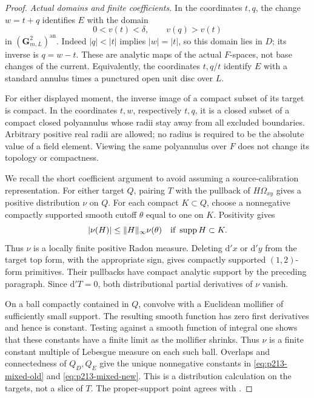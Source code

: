 \begin{proof}
\emph{Actual domains and finite coefficients.}
In the coordinates \(t,q\), the change \(w=t+q\) identifies
\(E\) with the domain
\[
             0<v(t)<\delta,\qquad v(q)>v(t)
\]
in \((\mathbf G_{m,L}^2)^{\mathrm{an}}\).
Indeed \(|q|<|t|\) implies \(|w|=|t|\), so this domain
lies in \(D\); its inverse is \(q=w-t\).
These are analytic maps of the actual \(F\)-spaces, not
base changes of the current. Equivalently, the coordinates
\(t,q/t\) identify \(E\) with a standard annulus times a
punctured open unit disc over \(L\).

For either displayed moment, the inverse image of a compact
subset of its target is compact. In the coordinates \(t,w\),
respectively \(t,q\), it is a closed subset of a compact
closed polyannulus whose radii stay away from all excluded
boundaries. Arbitrary positive real radii are allowed; no
radius is required to be the absolute value of a field
element. Viewing the same polyannulus over \(F\) does not
change its topology or compactness.

We recall the short coefficient argument to avoid assuming
a source-calibration representation. For either target \(Q\),
pairing \(T\) with the pullback of \(H\Omega_{xy}\) gives a
positive distribution \(\nu\) on \(Q\). For each compact
\(K\subset Q\), choose a nonnegative compactly supported
smooth cutoff \(\theta\) equal to one on \(K\). Positivity
gives
\[
 |\nu(H)|\leq\|H\|_\infty\nu(\theta)
       \quad\hbox{if }\operatorname{supp}H\subset K.
\]
Thus \(\nu\) is a locally finite positive Radon measure.
Deleting \(\mathrm d'x\) or \(\mathrm d'y\) from the target
top form, with the appropriate sign, gives compactly
supported \((1,2)\)-form primitives. Their pullbacks have
compact analytic support by the preceding paragraph.
Since \(\mathrm d'T=0\), both distributional partial
derivatives of \(\nu\) vanish.

On a ball compactly contained in \(Q\), convolve with a
Euclidean mollifier of sufficiently small support.
The resulting smooth function has zero first derivatives
and hence is constant. Testing against a smooth function
of integral one shows that these constants have a finite
limit as the mollifier shrinks. Thus \(\nu\) is a finite
constant multiple of Lebesgue measure on each such ball.
Overlaps and connectedness of \(Q_D,Q_E\) give the unique
nonnegative constants in
\eqref{eq:p213-mixed-old} and \eqref{eq:p213-mixed-new}.
This is a distribution calculation on the targets, not
a slice of \(T\). The proper-support point agrees with
\cite[Section 7.1.11, p.~159]{CLD25}.


\end{proof}
